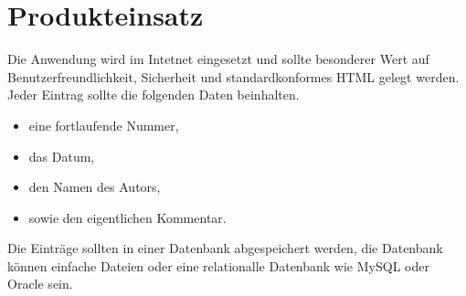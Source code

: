 \section{Produkteinsatz}
 
Die Anwendung wird im Intetnet eingesetzt und sollte besonderer Wert auf Benutzerfreundlichkeit, Sicherheit und
standardkonformes HTML gelegt werden. Jeder Eintrag sollte die folgenden Daten beinhalten.

\begin{itemize}
\item eine fortlaufende Nummer,
\item das Datum,
\item den Namen des Autors,
\item sowie den eigentlichen Kommentar.
\end{itemize}

Die Einträge sollten in einer Datenbank abgespeichert werden, die Datenbank
können einfache Dateien oder eine relationalle Datenbank wie MySQL oder Oracle
sein.
